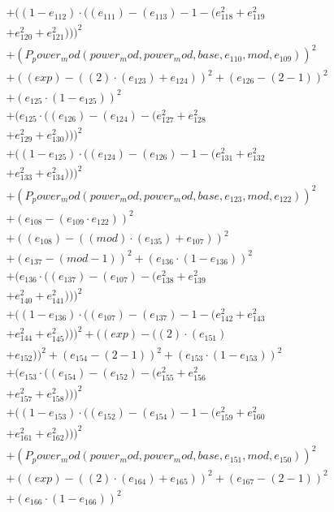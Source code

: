 \documentclass[10pt, a4paper]{article}
\begin{document}
\begin{align*}
& + ((1 - e_{112})  \cdot  ((e_{111}) - (e_{113}) - 1 - (e_{118}^{2} + e_{119}^{2} \\
& + e_{120}^{2} + e_{121}^{2})))^{2} \\
& + (P_power_mod(power_mod, power_mod, base, e_{110}, mod, e_{109}))^{2} \\
& + ((exp) - ((2)  \cdot  (e_{123}) + e_{124}))^{2} + (e_{126} - (2 - 1))^{2} \\
& + (e_{125}  \cdot  (1 - e_{125}))^{2} \\
& + (e_{125}  \cdot  ((e_{126}) - (e_{124}) - (e_{127}^{2} + e_{128}^{2} \\
& + e_{129}^{2} + e_{130}^{2})))^{2} \\
& + ((1 - e_{125})  \cdot  ((e_{124}) - (e_{126}) - 1 - (e_{131}^{2} + e_{132}^{2} \\
& + e_{133}^{2} + e_{134}^{2})))^{2} \\
& + (P_power_mod(power_mod, power_mod, base, e_{123}, mod, e_{122}))^{2} \\
& + (e_{108} - (e_{109}  \cdot  e_{122}))^{2} \\
& + ((e_{108}) - ((mod)  \cdot  (e_{135}) + e_{107}))^{2} \\
& + (e_{137} - (mod - 1))^{2} + (e_{136}  \cdot  (1 - e_{136}))^{2} \\
& + (e_{136}  \cdot  ((e_{137}) - (e_{107}) - (e_{138}^{2} + e_{139}^{2} \\
& + e_{140}^{2} + e_{141}^{2})))^{2} \\
& + ((1 - e_{136})  \cdot  ((e_{107}) - (e_{137}) - 1 - (e_{142}^{2} + e_{143}^{2} \\
& + e_{144}^{2} + e_{145}^{2})))^{2} + ((exp) - ((2)  \cdot  (e_{151}) \\
& + e_{152}))^{2} + (e_{154} - (2 - 1))^{2} + (e_{153}  \cdot  (1 - e_{153}))^{2} \\
& + (e_{153}  \cdot  ((e_{154}) - (e_{152}) - (e_{155}^{2} + e_{156}^{2} \\
& + e_{157}^{2} + e_{158}^{2})))^{2} \\
& + ((1 - e_{153})  \cdot  ((e_{152}) - (e_{154}) - 1 - (e_{159}^{2} + e_{160}^{2} \\
& + e_{161}^{2} + e_{162}^{2})))^{2} \\
& + (P_power_mod(power_mod, power_mod, base, e_{151}, mod, e_{150}))^{2} \\
& + ((exp) - ((2)  \cdot  (e_{164}) + e_{165}))^{2} + (e_{167} - (2 - 1))^{2} \\
& + (e_{166}  \cdot  (1 - e_{166}))^{2} \\

\end{align*}
\end{document}
